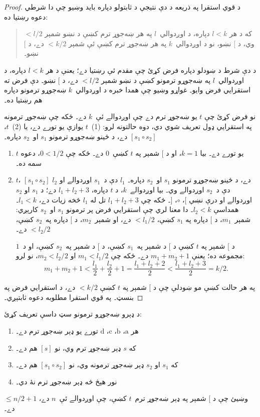 \documentclass[../../../include/open-logic-section]{subfiles}
\begin{document}
\begin{proof}
د قوي استقرا په ذريعه د دې نتيجې د ثابتولو دپاره
بايد وښيو چې دا شرطي دعوه رښتيا ده:
\begin{quote}
که د هر $l < k$ دپاره، د اوږدوالي~$l$ په هر ښه‌جوړ ترم
کښې د نښو شمېر $< l/2$ وي، د $[$ نښو، نو د
اوږدوالي~$k$ په هر ښه‌جوړ ترم کښې ئې شمېر $< k/2$
دے، د $[$ نښو۔
\end{quote}
د دې شرط د ښودلو دپاره فرض کړئ چې مقدم ئې رښتيا
دے؛ يعنې د هر $l<k$ دپاره، د اوږدوالي~$l$ په ښه‌جوړو
ترمونو کښې د نښو شمېر $< l/2$ دے، د $[$ نښو۔ دې فرض ته
استقرايي فرض وايو۔ غواړو وښيو چې همدا خبره د
اوږدوالي~$k$ ښه‌جوړو ترمونو دپاره هم رښتيا ده۔

نو فرض کړئ چې $t$ يو ښه‌جوړ ترم دے چې اوږدوالے
ئې~$k$ دے۔ ځکه چې ښه‌جوړ ترمونه په استقرايي ډول
تعريف شوي دي، دوه حالتونه لرو: (1)~$t$ يوازې يو
تورے دے، يا (2)~$t$، $[s_1 \circ s_2]$ دے، د ځينو
ښه‌جوړو ترمونو $s_1$ او~$s_2$ دپاره۔
\begin{enumerate}
\item $t$ يو تورے دے۔ بيا $k = 1$، او د $[$ شمېر په
$t$ کښې~$0$ دے۔ ځکه چې $0 < 1/2$، دعوه سمه ده۔
\item $t$، $[s_1 \circ s_2]$ دے، د ځينو ښه‌جوړو ترمونو
  $s_1$ او~$s_2$ دپاره۔ $l_1$ دې د~$s_1$ اوږدوالے
  او $l_2$ دې د~$s_2$ اوږدوالے وي۔ بيا اوږدوالے~$k$،
  د $t$ دپاره، $l_1+l_2+3$ دے؛ د $s_1$ او $s_2$
  اوږدوالے او درې نښې $[$، $\circ$، $]$۔ ځکه چې
  $l_1+l_2+3$ تل له $l_1$ څخه زيات دے، $l_1 < k$۔
  همداسې $l_2
  < k$۔ دا معنا لري چې استقرايي فرض پر ترمونو
  $s_1$ او~$s_2$ کارېږي: شمېر~$m_1$، د $[$ دپاره
  په $s_1$ کښې، $< l_1/2$ دے، او شمېر~$m_2$، د
  $[$ دپاره په~$s_2$ کښې، $< l_2/2$ دے۔

د $[$ شمېر په $t$ کښې د $[$ د شمېر په~$s_1$
کښې، د $[$ د شمېر په~$s_2$ کښې، او د~$1$ مجموعه
ده؛ يعنې $m_1 + m_2 + 1$ دے۔ ځکه چې $m_1
  < l_1/2$ او $m_2 < l_2/2$، نو لرو:
  \[
  m_1 + m_2 + 1 < \frac{l_1}{2} + \frac{l_2}{2} + 1 = \frac{l_1+l_2+2}{2} < \frac{l_1+l_2+3}{2} = k/2.
  \]
\end{enumerate}
په هر حالت کښې مو ښودلې چې د $[$ شمېر په $t$ کښې
$< k/2$ دے، د استقرايي فرض په بنسټ۔ په قوي استقرا
مطلوبه دعوه ثابتېږي۔
\end{proof}

\begin{prob}
د ډېرو ښه‌جوړو ترمونو سټ داسې تعريف کړئ:
  \begin{enumerate}
  \item هر $\mathrm{a}$، $\mathrm{b}$، $\mathrm{c}$،
    $\mathrm{d}$ تورے يو ډېر ښه‌جوړ ترم دے۔
  \item که $s$ ډېر ښه‌جوړ ترم وي، نو $[s]$ هم دے۔
  \item که $s_1$ او $s_2$ ډېر ښه‌جوړ ترمونه وي، نو
    $[s_1 \circ s_2]$ هم دے۔
  \item نور هېڅ څه ډېر ښه‌جوړ ترم نۀ دي۔
  \end{enumerate}
وښيئ چې د $[$ شمېر په ډېر ښه‌جوړ ترم~$t$ کښې، چې
اوږدوالے ئې~$n$ دے، $\le n/2 +1$ دے۔
\end{prob}
\end{document}
